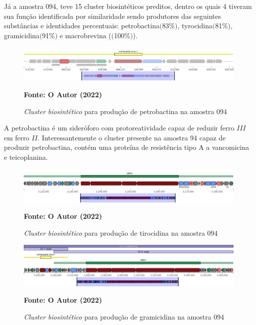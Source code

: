Já a amostra 094, teve 15 cluster biosintéticos preditos, dentro os quais 4 tiveram sua função identificada
por similaridade sendo produtores das seguintes substâncias e identidades percentuais: petrobactina$($83\%$)$, 
tyrocidina$($81\%$)$, gramicidina$($91\%$)$ e macrobrevina ($($100\%$)$). 


 \begin{figure}[H]
	\caption{\textit{Cluster biosintético} para produção de petrobactina na amostra 094}
	\label{fig:quast_16}
	\centering
		\includegraphics[width=0.8\linewidth]{imagens/antismash/094regiao1.png} \\
	\centering
    \begin{small}\textbf{Fonte: O Autor (2022)}\end{small}
\end{figure}
\vspace{\floatsep}

A petrobactina é um sideróforo com protoreatividade capaz de reduzir ferro $III$ em 
ferro $II$\cite{barbeau2002petrobactin}. Interessantemente o cluster presente na amostra 94
capaz de produzir petrobactina, contém uma proteína de resistência tipo A a vancomicina e teicoplanina.

\begin{figure}[H]
	\caption{\textit{Cluster biosintético} para produção de tirocidina na amostra 094}
	\label{fig:quast_16}
	\centering
		\includegraphics[width=0.8\linewidth]{imagens/antismash/094regiao2.png} \\
	\centering
    \begin{small}\textbf{Fonte: O Autor (2022)}\end{small}
\end{figure}
\vspace{\floatsep}

\begin{figure}[H]
	\caption{\textit{Cluster biosintético} para produção de gramicidina na amostra 094}
	\label{fig:quast_16}
	\centering
		\includegraphics[width=0.8\linewidth]{imagens/antismash/094regiao3.png} \\
	\centering
    \begin{small}\textbf{Fonte: O Autor (2022)}\end{small}
\end{figure}
\vspace{\floatsep}

